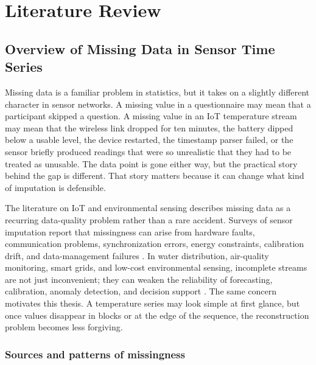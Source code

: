 
\chapter{Literature Review}
\label{ch:literature-review}

\section{Overview of Missing Data in Sensor Time Series}

Missing data is a familiar problem in statistics, but it takes on a slightly different character in sensor networks. A missing value in a questionnaire may mean that a participant skipped a question. A missing value in an IoT temperature stream may mean that the wireless link dropped for ten minutes, the battery dipped below a usable level, the device restarted, the timestamp parser failed, or the sensor briefly produced readings that were so unrealistic that they had to be treated as unusable. The data point is gone either way, but the practical story behind the gap is different. That story matters because it can change what kind of imputation is defensible.

The literature on IoT and environmental sensing describes missing data as a recurring data-quality problem rather than a rare accident. Surveys of sensor imputation report that missingness can arise from hardware faults, communication problems, synchronization errors, energy constraints, calibration drift, and data-management failures \cite{Adhikari2022ACS,Agbo2022MissingDI,Osman2018ASO}. In water distribution, air-quality monitoring, smart grids, and low-cost environmental sensing, incomplete streams are not just inconvenient; they can weaken the reliability of forecasting, calibration, anomaly detection, and decision support \cite{Osman2018ASO,Schreiber2023DataIT,Agbo2022MissingDI}. The same concern motivates this thesis. A temperature series may look simple at first glance, but once values disappear in blocks or at the edge of the sequence, the reconstruction problem becomes less forgiving.

\subsection{Sources and patterns of missingness}

